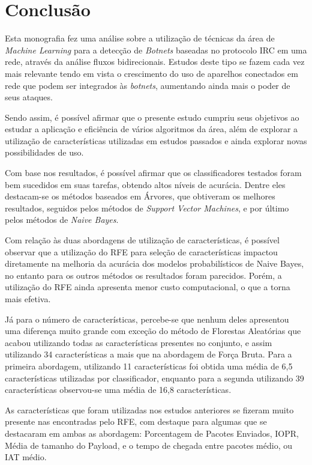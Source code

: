 \chapter{Conclusão}
\label{c.conclusao}

Esta monografia fez uma análise sobre a utilização de técnicas da área de \textit{Machine Learning} para a detecção de \textit{Botnets} baseadas no protocolo IRC em uma rede, através da análise fluxos bidirecionais. Estudos deste tipo se fazem cada vez mais relevante tendo em vista o crescimento do uso de aparelhos conectados em rede que podem ser integrados às \textit{botnets}, aumentando ainda mais o poder de seus ataques.

Sendo assim, é possível afirmar que o presente estudo cumpriu seus objetivos ao estudar a aplicação e eficiência de vários algoritmos da área, além de explorar a utilização de características utilizadas em estudos passados e ainda explorar novas possibilidades de uso. 

Com base nos resultados, é possível afirmar que os classificadores testados foram bem sucedidos em suas tarefas, obtendo altos níveis de acurácia. Dentre eles destacam-se os métodos baseados em Árvores, que obtiveram os melhores resultados, seguidos pelos métodos de \textit{Support Vector Machines}, e por último pelos métodos de \textit{Naive Bayes}.

Com relação às duas abordagens de utilização de características, é possível observar que a utilização do RFE para seleção de características impactou diretamente na melhoria da acurácia dos modelos probabilísticos de Naive Bayes, no entanto para os outros métodos os resultados foram parecidos. Porém, a utilização do RFE ainda apresenta menor custo computacional, o que a torna mais efetiva.

Já para o número de características, percebe-se que nenhum deles apresentou uma diferença muito grande com exceção do método de Florestas Aleatórias que acabou utilizando todas as características presentes no conjunto, e assim utilizando 34 características a mais que na abordagem de Força Bruta. Para a primeira abordagem, utilizando 11 características foi obtida uma média de 6,5 características utilizadas por classificador, enquanto para a segunda utilizando 39 características observou-se uma média de 16,8 características.

As características que foram utilizadas nos estudos anteriores se fizeram muito presente nas encontradas pelo RFE, com destaque para algumas que se destacaram em ambas as abordagem: Porcentagem de Pacotes Enviados, IOPR, Média de tamanho do Payload, e o tempo de chegada entre pacotes médio, ou IAT médio. 

